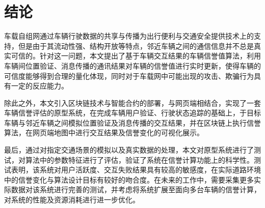\chapter{结论}
车载自组网通过车辆行驶数据的共享与传播为出行便利与交通安全提供技术上的支持，但是由于其流动性强、结构开放等特点，邻近车辆之间的通信信息并不总是真实可信的。针对这一问题，本文提出了基于车辆交互结果的车辆信誉值算法，利用车辆间位置验证、消息传播的通讯结果对车辆的信誉值进行实时更新，使得车辆的可信度能够得到合理的量化体现，同时对于车载网中可能出现的攻击、欺骗行为具有一定的反应能力。

除此之外，本文引入区块链技术与智能合约的部署，与网页端相结合，实现了一套车辆信誉评估的原型系统，在完成车辆用户验证、行驶状态追踪的基础上，于目标车辆与邻近车辆之间模拟位置验证及消息传播的交互结果，并在区块链上执行信誉算法，在网页端地图中进行交互结果及信誉变化的可视化展示。

最后，通过对指定交通场景的模拟以及真实数据的处理，本文对原型系统进行了测试，对算法中的参数特征进行了评估，验证了系统在信誉计算功能上的科学性。测试表明，该系统对用户活跃度、交互失败结果具有较高的敏感度，在实际道路环境中的信誉变化与算法设计目标有较好的吻合度。在未来的工作中，需要采集更多实际数据对该系统进行完善的测试，并考虑将系统扩展至面向多台车辆的信誉计算，对系统的性能及资源消耗进行进一步优化。